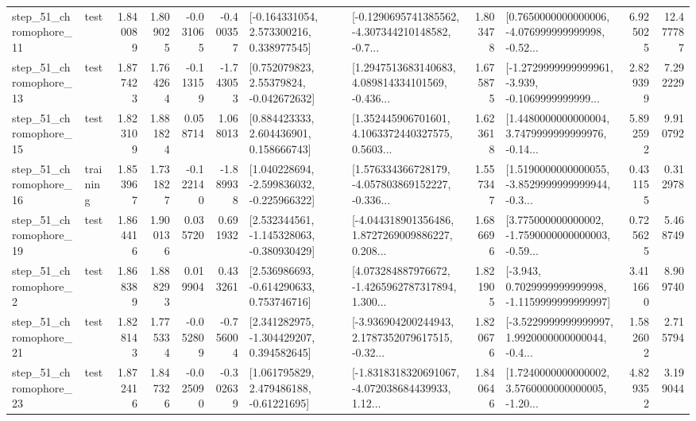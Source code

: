 \begin{tabular}{llrrrrllrlrr}
   step\_51\_chromophore\_11 &      test &      1.840089 &    1.809025 &     -0.031065 & -0.400357 &    [-0.164331054, 2.573300216, 0.338977545] &  [-0.1290695741385562, -4.307344210148582, -0.7... &       1.803478 &  [0.7650000000000006, -4.076999999999998, -0.52... &            6.925025 &         12.477787 \\
   step\_51\_chromophore\_13 &      test &      1.877423 &    1.764264 &     -0.113159 & -1.743053 &     [0.752079823, 2.55379824, -0.042672632] &  [1.2947513683140683, 4.089814334101569, -0.436... &       1.675875 &  [-1.2729999999999961, -3.939, -0.1069999999999... &            2.829399 &          7.292229 \\
   step\_51\_chromophore\_15 &      test &      1.823109 &    1.881824 &      0.058714 &  1.068013 &     [0.884423333, 2.604436901, 0.158666743] &  [1.352445906701601, 4.1063372440327575, 0.5603... &       1.623618 &  [1.4480000000000004, 3.7479999999999976, -0.14... &            5.892592 &          9.910792 \\
   step\_51\_chromophore\_16 &  training &      1.853967 &    1.731827 &     -0.122140 & -1.889938 &   [1.040228694, -2.599836032, -0.225966322] &  [1.576334366728179, -4.057803869152227, -0.336... &       1.557347 &  [1.5190000000000055, -3.8529999999999944, -0.3... &            0.431155 &          0.312978 \\
   step\_51\_chromophore\_19 &      test &      1.864416 &    1.900136 &      0.035720 &  0.691932 &   [2.532344561, -1.145328063, -0.380930429] &  [-4.044318901356486, 1.8727269009886227, 0.208... &       1.686696 &  [3.775000000000002, -1.7590000000000003, -0.59... &            0.725625 &          5.468749 \\
    step\_51\_chromophore\_2 &      test &      1.868389 &    1.888293 &      0.019904 &  0.433261 &    [2.536986693, -0.614290633, 0.753746716] &  [4.073284887976672, -1.4265962787317894, 1.300... &       1.821905 &  [-3.943, 0.7029999999999998, -1.1159999999999997] &            3.411660 &          8.909740 \\
   step\_51\_chromophore\_21 &      test &      1.828143 &    1.775334 &     -0.052809 & -0.756004 &    [2.341282975, -1.304429207, 0.394582645] &  [-3.936904200244943, 2.1787352079617515, -0.32... &       1.820676 &  [-3.5229999999999997, 1.9920000000000044, -0.4... &            1.582602 &          2.715794 \\
   step\_51\_chromophore\_23 &      test &      1.872416 &    1.847326 &     -0.025090 & -0.302639 &     [1.061795829, 2.479486188, -0.61221695] &  [-1.8318318320691067, -4.072038684439933, 1.12... &       1.840646 &  [1.7240000000000002, 3.5760000000000005, -1.20... &            4.829352 &          3.199044 \\

\end{tabular}
